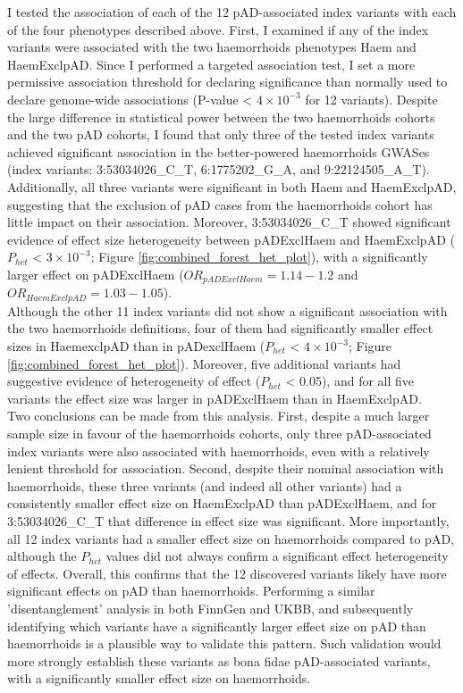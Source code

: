 I tested the association of each of the 12 pAD-associated index variants with each of the four phenotypes described above. First, I examined if any of the index variants were associated with the two haemorrhoids phenotypes Haem and HaemExclpAD. Since I performed a targeted association test, I set a more permissive association threshold for declaring significance than normally used to declare genome-wide associations (P-value < $4\times10^{-3}$ for 12 variants). Despite the large difference in statistical power between the two haemorrhoids cohorts and the two pAD cohorts, I found that only three of the tested index variants achieved significant association in the better-powered haemorrhoids GWASes (index variants: 3:53034026\_C\_T, 6:1775202\_G\_A, and 9:22124505\_A\_T). Additionally, all three variants were significant in both Haem and HaemExclpAD, suggesting that the exclusion of pAD cases from the haemorrhoids cohort has little impact on their association. Moreover, 3:53034026\_C\_T showed significant evidence of effect size heterogeneity between pADExclHaem and HaemExclpAD ($P_{het}$ < $3\times10^{-3}$; Figure \ref{fig:combined_forest_het_plot}), with a significantly larger effect on pADExclHaem ($OR_{pADExclHaem}=1.14-1.2$ and $OR_{HaemExclpAD}=1.03-1.05$).\\

Although the other 11 index variants did not show a significant association with the two haemorrhoids definitions, four of them had significantly smaller effect sizes in HaemexclpAD than in pADexclHaem ($P_{het}$ < $4\times10^{-3}$; Figure \ref{fig:combined_forest_het_plot}). Moreover, five additional variants had suggestive evidence of heterogeneity of effect ($P_{het}$ < 0.05), and for all five variants the effect size was larger in pADExclHaem than in HaemExclpAD. \\

Two conclusions can be made from this analysis. First, despite a much larger sample size in favour of the haemorrhoids cohorts, only three pAD-associated index variants were also associated with haemorrhoids, even with a relatively lenient threshold for association. Second, despite their nominal association with haemorrhoids, these three variants (and indeed all other variants) had a consistently smaller effect size on HaemExclpAD than pADExclHaem, and for 3:53034026\_C\_T that difference in effect size was significant. More importantly, all 12 index variants had a smaller effect size on haemorrhoids compared to pAD, although the $P_{het}$ values did not always confirm a significant effect heterogeneity of effects. Overall, this confirms that the 12 discovered variants likely have more significant effects on pAD than haemorrhoids. Performing a similar 'disentanglement' analysis in both FinnGen and UKBB, and subsequently identifying which variants have a significantly larger effect size on pAD than haemorrhoids is a plausible way to validate this pattern. Such validation would more strongly establish these variants as bona fidae pAD-associated variants, with a significantly smaller effect size on haemorrhoids.\\

